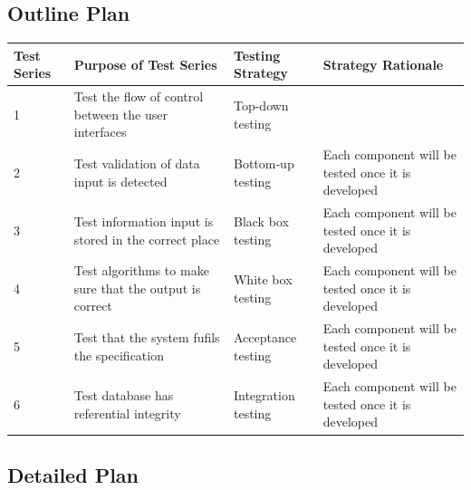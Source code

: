 \begin{landscape}
\subsection{Outline Plan}

\begin{center}
    \begin{tabular}{|p{2cm}|p{5cm}|p{5cm}|p{4cm}|}
        \hline
        \textbf{Test Series} & \textbf{Purpose of Test Series} & \textbf{Testing Strategy} & \textbf{Strategy Rationale}\\ \hline
         1 & Test the flow of control between the user interfaces & Top-down testing &  \\ \hline
	2 & Test validation of data input is detected & Bottom-up testing & Each component will be tested once it is developed \\ \hline
	3 & Test information input is stored in the correct place & Black box testing & Each component will be tested once it is developed \\ \hline
	4 & Test algorithms to make sure that the output is correct & White box testing & Each component will be tested once it is developed \\ \hline
	5 & Test that the system fufils the specification & Acceptance testing & Each component will be tested once it is developed \\ \hline
	6 & Test database has referential integrity & Integration testing & Each component will be tested once it is developed \\ \hline
    \end{tabular}
\end{center}

\subsection{Detailed Plan}


\end{landscape}
